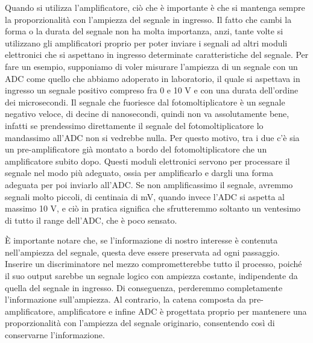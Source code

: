 Quando si utilizza l'amplificatore, ciò che è importante è che si mantenga sempre la proporzionalità con l'ampiezza del segnale in ingresso. Il fatto che cambi la forma o la durata del segnale non ha molta importanza, anzi, tante volte si utilizzano gli amplificatori proprio per poter inviare i segnali ad altri moduli elettronici che si aspettano in ingresso determinate caratteristiche del segnale. Per fare un esempio, supponiamo di voler misurare l'ampiezza di un segnale con un ADC come quello che abbiamo adoperato in laboratorio, il quale si aspettava in ingresso un segnale positivo compreso fra 0 e 10 V e con una durata dell'ordine dei microsecondi. Il segnale che fuoriesce dal fotomoltiplicatore è un segnale negativo veloce, di decine di nanosecondi, quindi non va assolutamente bene, infatti se prendessimo direttamente il segnale del fotomoltiplicatore lo mandassimo all'ADC non si vedrebbe nulla. Per questo motivo, tra i due c'è sia un pre-amplificatore già montato a bordo del fotomoltiplicatore che un amplificatore subito dopo. Questi moduli elettronici servono per processare il segnale nel modo più adeguato, ossia per amplificarlo e dargli una forma adeguata per poi inviarlo all'ADC. Se non amplificassimo il segnale, avremmo segnali molto piccoli, di centinaia di mV, quando invece l'ADC si aspetta al massimo 10 V, e ciò in pratica significa che sfrutteremmo soltanto un ventesimo di tutto il range dell'ADC, che è poco sensato.


È importante notare che, se l'informazione di nostro interesse è contenuta nell'ampiezza del segnale, questa deve essere preservata ad ogni passaggio. Inserire un discriminatore nel mezzo comprometterebbe tutto il processo, poiché il suo output sarebbe un segnale logico con ampiezza costante, indipendente da quella del segnale in ingresso. Di conseguenza, perderemmo completamente l'informazione sull'ampiezza. Al contrario, la catena composta da pre-amplificatore, amplificatore e infine ADC è progettata proprio per mantenere una proporzionalità con l'ampiezza del segnale originario, consentendo così di conservarne l'informazione.

